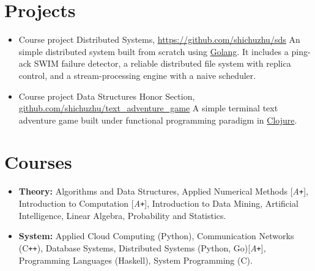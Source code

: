 \documentclass[11pt,a4paper,sans]{moderncv}        %
\begin{document}
\section{Projects}
\vspace{-5pt}
\begin{itemize}
	\item{
	      {Course project}
	      {\vspace{-10pt}}
	      {}
	      {Distributed Systems,
		      \href{https://github.com/shichuzhu/sds}
		      {\underline{https://github.com/shichuzhu/sds}}}
	      {
			An simple distributed system built from scratch using \underline{Golang}.
			It includes a ping-ack SWIM failure detector, a reliable distributed file system with replica control, and a stream-processing engine with a naive scheduler.
	      }}
	      
	\item{
	      {Course project}
	      {\vspace{-10pt}}
	      {}
	      {Data Structures Honor Section,
		      \href{https://github.com/shichuzhu/text_adventure_game}{\underline{github.com/shichuzhu/text\_adventure\_game}}
	      }
	      {
		      A simple terminal text adventure game built under functional programming paradigm in \underline{Clojure}.}
	      }
\end{itemize}

\vspace{-5pt}
\section{Courses}
\vspace{-5pt}
\begin{itemize}\small
	\item \textbf{Theory:}
	      Algorithms and Data Structures,
	      Applied Numerical Methods [\emph{A\texttt{+}}],
	      Introduction to Computation [\emph{A\texttt{+}}],
		Introduction to Data Mining,
		Artificial Intelligence,
	      Linear Algebra,
	      Probability and Statistics.
	\item \textbf{System:}
	      Applied Cloud Computing (Python),
	      Communication Networks (C\texttt{++}),
	      Database Systems,
	      Distributed Systems (Python, Go)[\emph{A\texttt{+}}],
	      Programming Languages (Haskell),
	      System Programming (C).
\end{itemize}
\end{document}
